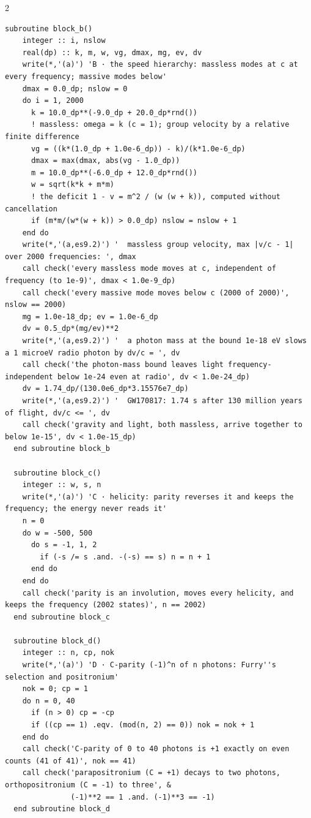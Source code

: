 \documentclass[10pt]{article}
\begin{document}
\begin{multicols}{2}
\begin{Verbatim}[fontsize=\fontsize{6.0}{6.9}\selectfont,breaklines,breakanywhere,breaksymbolleft={}]
  subroutine block_b()
    integer :: i, nslow
    real(dp) :: k, m, w, vg, dmax, mg, ev, dv
    write(*,'(a)') 'B · the speed hierarchy: massless modes at c at every frequency; massive modes below'
    dmax = 0.0_dp; nslow = 0
    do i = 1, 2000
      k = 10.0_dp**(-9.0_dp + 20.0_dp*rnd())
      ! massless: omega = k (c = 1); group velocity by a relative finite difference
      vg = ((k*(1.0_dp + 1.0e-6_dp)) - k)/(k*1.0e-6_dp)
      dmax = max(dmax, abs(vg - 1.0_dp))
      m = 10.0_dp**(-6.0_dp + 12.0_dp*rnd())
      w = sqrt(k*k + m*m)
      ! the deficit 1 - v = m^2 / (w (w + k)), computed without cancellation
      if (m*m/(w*(w + k)) > 0.0_dp) nslow = nslow + 1
    end do
    write(*,'(a,es9.2)') '  massless group velocity, max |v/c - 1| over 2000 frequencies: ', dmax
    call check('every massless mode moves at c, independent of frequency (to 1e-9)', dmax < 1.0e-9_dp)
    call check('every massive mode moves below c (2000 of 2000)', nslow == 2000)
    mg = 1.0e-18_dp; ev = 1.0e-6_dp
    dv = 0.5_dp*(mg/ev)**2
    write(*,'(a,es9.2)') '  a photon mass at the bound 1e-18 eV slows a 1 microeV radio photon by dv/c = ', dv
    call check('the photon-mass bound leaves light frequency-independent below 1e-24 even at radio', dv < 1.0e-24_dp)
    dv = 1.74_dp/(130.0e6_dp*3.15576e7_dp)
    write(*,'(a,es9.2)') '  GW170817: 1.74 s after 130 million years of flight, dv/c <= ', dv
    call check('gravity and light, both massless, arrive together to below 1e-15', dv < 1.0e-15_dp)
  end subroutine block_b

  subroutine block_c()
    integer :: w, s, n
    write(*,'(a)') 'C · helicity: parity reverses it and keeps the frequency; the energy never reads it'
    n = 0
    do w = -500, 500
      do s = -1, 1, 2
        if (-s /= s .and. -(-s) == s) n = n + 1
      end do
    end do
    call check('parity is an involution, moves every helicity, and keeps the frequency (2002 states)', n == 2002)
  end subroutine block_c

  subroutine block_d()
    integer :: n, cp, nok
    write(*,'(a)') 'D · C-parity (-1)^n of n photons: Furry''s selection and positronium'
    nok = 0; cp = 1
    do n = 0, 40
      if (n > 0) cp = -cp
      if ((cp == 1) .eqv. (mod(n, 2) == 0)) nok = nok + 1
    end do
    call check('C-parity of 0 to 40 photons is +1 exactly on even counts (41 of 41)', nok == 41)
    call check('parapositronium (C = +1) decays to two photons, orthopositronium (C = -1) to three', &
               (-1)**2 == 1 .and. (-1)**3 == -1)
  end subroutine block_d


\end{Verbatim}
\end{multicols}
\end{document}
